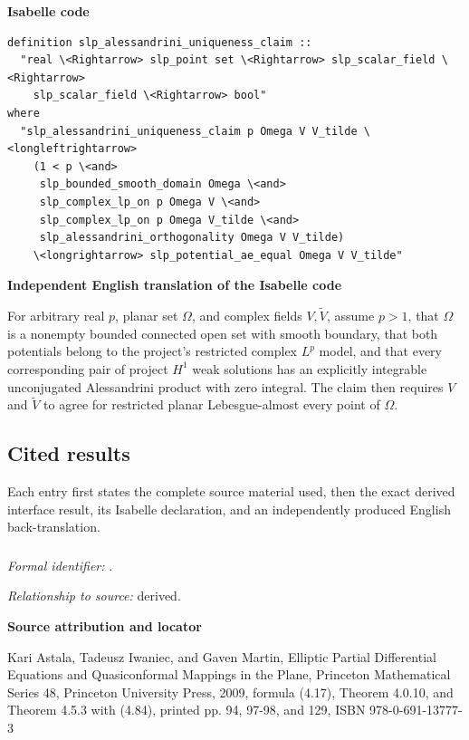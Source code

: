 \documentclass[10pt,oneside]{article}
\newcommand{\reviewlabel}[1]{\par\smallskip\noindent\textsf{\bfseries #1}\par\smallskip}
\begin{document}
\reviewlabel{Isabelle code}
\begin{lstlisting}
definition slp_alessandrini_uniqueness_claim ::
  "real \<Rightarrow> slp_point set \<Rightarrow> slp_scalar_field \<Rightarrow>
    slp_scalar_field \<Rightarrow> bool"
where
  "slp_alessandrini_uniqueness_claim p Omega V V_tilde \<longleftrightarrow>
    (1 < p \<and>
     slp_bounded_smooth_domain Omega \<and>
     slp_complex_lp_on p Omega V \<and>
     slp_complex_lp_on p Omega V_tilde \<and>
     slp_alessandrini_orthogonality Omega V V_tilde)
    \<longrightarrow> slp_potential_ae_equal Omega V V_tilde"
\end{lstlisting}

\reviewlabel{Independent English translation of the Isabelle code}
For arbitrary real $p$, planar set $\Omega$, and complex fields
$V,\widetilde V$, assume $p>1$, that $\Omega$ is a nonempty bounded connected
open set with smooth boundary, that both potentials belong to the project's
restricted complex $L^p$ model, and that every corresponding pair of project
$H^1$ weak solutions has an explicitly integrable unconjugated Alessandrini
product with zero integral. The claim then requires $V$ and $\widetilde V$ to
agree for restricted planar Lebesgue-almost every point of $\Omega$.

\subsection{Cited results}
Each entry first states the complete source material used, then the exact
derived interface result, its Isabelle declaration, and an independently
produced English back-translation.
\subsubsection{\texttt{}}
\noindent\textit{Formal identifier:} \texttt{}.\par
\noindent\textit{Relationship to source:} derived.

\reviewlabel{Source attribution and locator}
Kari Astala, Tadeusz Iwaniec, and Gaven Martin, Elliptic Partial Differential Equations and Quasiconformal Mappings in the Plane, Princeton Mathematical Series 48, Princeton University Press, 2009, formula (4.17), Theorem 4.0.10, and Theorem 4.5.3 with (4.84), printed pp. 94, 97-98, and 129, ISBN 978-0-691-13777-3
\end{document}
